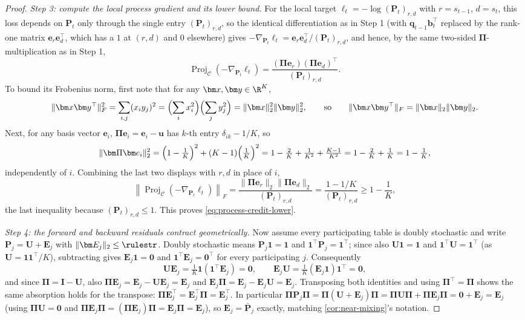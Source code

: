 \begin{proof}
\emph{Step 3: compute the local process gradient and its lower bound.}
For the local target $\ell_t=-\log(\bm P_t)_{r,d}$ with $r=s_{t-1}$, $d=s_t$,
this loss depends on $\bm P_t$ only through the single entry
$(\bm P_t)_{r,d}$, so the identical differentiation as in Step 1 (with
$\bm q_{t-1}\bm b_t^\top$ replaced by the rank-one matrix $\bm e_r\bm e_d^\top$,
which has a $1$ at $(r,d)$ and $0$ elsewhere) gives
$-\nabla_{\bm P_t}\ell_t=\bm e_r\bm e_d^\top/(\bm P_t)_{r,d}$, and hence, by the
same two-sided $\bm\Pi$-multiplication as in Step 1,
\[
 \operatorname{Proj}_{\mathcal C}(-\nabla_{\bm P_t}\ell_t)
 =\frac{(\bm{\Pi} \bm{e}_r)(\bm{\Pi} \bm{e}_d)^\top}{(\bm{P}_t)_{r,d}}.
\]
To bound its Frobenius norm, first note that for any $\bm x,\bm y\in\R^K$,
\[
 \|\bm x\bm y^\top\|_F^2=\sum_{i,j}(x_iy_j)^2
 =\Bigl(\sum_i x_i^2\Bigr)\Bigl(\sum_j y_j^2\Bigr)=\|\bm x\|_2^2\|\bm y\|_2^2,
 \qquad\text{so}\qquad
 \|\bm x\bm y^\top\|_F=\|\bm x\|_2\|\bm y\|_2 .
\]
Next, for any basis vector $\bm e_i$, $\bm\Pi\bm e_i=\bm e_i-\bm u$ has $k$-th
entry $\delta_{ik}-1/K$, so
\[
 \|\bm\Pi\bm e_i\|_2^2
 =\Bigl(1-\tfrac1K\Bigr)^2+(K-1)\Bigl(\tfrac1K\Bigr)^2
 =1-\tfrac2K+\tfrac1{K^2}+\tfrac{K-1}{K^2}
 =1-\tfrac2K+\tfrac1K=1-\tfrac1K,
\]
independently of $i$. Combining the last two displays with $r,d$ in place of
$i$,
\[
 \left\|\operatorname{Proj}_{\mathcal C}(-\nabla_{\bm P_t}\ell_t)\right\|_F
 =\frac{\|\bm\Pi\bm e_r\|_2\|\bm\Pi\bm e_d\|_2}{(\bm P_t)_{r,d}}
 =\frac{1-1/K}{(\bm P_t)_{r,d}}\ge1-\frac1K,
\]
the last inequality because $(\bm P_t)_{r,d}\le1$. This proves
\cref{eq:process-credit-lower}.

\emph{Step 4: the forward and backward residuals contract geometrically.}
Now assume every participating table is doubly stochastic and write
$\bm{P}_j=\bm{U}+\bm{E}_j$ with $\|\bm E_j\|_2\le\rulestr$. Doubly stochastic means
$\bm P_j\mathbf1=\mathbf1$ and $\mathbf1^\top\bm P_j=\mathbf1^\top$; since also
$\bm U\mathbf1=\mathbf1$ and $\mathbf1^\top\bm U=\mathbf1^\top$ (as $\bm U=\mathbf1\mathbf1^\top/K$),
subtracting gives $\bm E_j\mathbf1=\bm0$ and $\mathbf1^\top\bm E_j=\bm0^\top$ for
every participating $j$. Consequently
\[
 \bm U\bm E_j=\tfrac1K\mathbf1(\mathbf1^\top\bm E_j)=\bm0,
 \qquad
 \bm E_j\bm U=\tfrac1K(\bm E_j\mathbf1)\mathbf1^\top=\bm0,
\]
and since $\bm\Pi=\bm I-\bm U$, also $\bm\Pi\bm E_j=\bm E_j-\bm U\bm E_j=\bm E_j$
and $\bm E_j\bm\Pi=\bm E_j-\bm E_j\bm U=\bm E_j$. Transposing both identities
and using $\bm\Pi^\top=\bm\Pi$ shows the same absorption holds for the
transpose: $\bm\Pi\bm E_j^\top=\bm E_j^\top\bm\Pi=\bm E_j^\top$. In
particular $\bm\Pi\bm P_j\bm\Pi=\bm\Pi(\bm U+\bm E_j)\bm\Pi=\bm\Pi\bm U\bm\Pi+\bm\Pi\bm E_j\bm\Pi
=\bm0+\bm E_j=\bm E_j$ (using $\bm\Pi\bm U=\bm0$ and $\bm\Pi\bm E_j\bm\Pi=(\bm\Pi\bm E_j)\bm\Pi=\bm E_j\bm\Pi=\bm E_j$),
so $\bm E_j=\bar{\bm P}_j$ exactly, matching \cref{cor:near-mixing}'s notation.


\end{proof}
